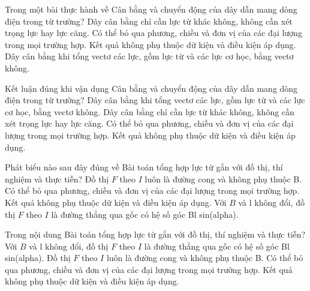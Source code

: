 \begin{ex}
Trong một bài thực hành về Cân bằng và chuyển động của dây dẫn mang dòng điện trong từ trường?
\choice
{Dây cân bằng chỉ cần lực từ khác không, không cần xét trọng lực hay lực căng.}
{Có thể bỏ qua phương, chiều và đơn vị của các đại lượng trong mọi trường hợp.}
{Kết quả không phụ thuộc dữ kiện và điều kiện áp dụng.}
{\True Dây cân bằng khi tổng vectơ các lực, gồm lực từ và các lực cơ học, bằng vectơ không.}
\end{ex}

\begin{ex}
Kết luận đúng khi vận dụng Cân bằng và chuyển động của dây dẫn mang dòng điện trong từ trường?
\choice
{\True Dây cân bằng khi tổng vectơ các lực, gồm lực từ và các lực cơ học, bằng vectơ không.}
{Dây cân bằng chỉ cần lực từ khác không, không cần xét trọng lực hay lực căng.}
{Có thể bỏ qua phương, chiều và đơn vị của các đại lượng trong mọi trường hợp.}
{Kết quả không phụ thuộc dữ kiện và điều kiện áp dụng.}
\end{ex}

\begin{ex}
Phát biểu nào sau đây đúng về Bài toán tổng hợp lực từ gắn với đồ thị, thí nghiệm và thực tiễn?
\choice
{Đồ thị $F$ theo $I$ luôn là đường cong và không phụ thuộc B.}
{Có thể bỏ qua phương, chiều và đơn vị của các đại lượng trong mọi trường hợp.}
{Kết quả không phụ thuộc dữ kiện và điều kiện áp dụng.}
{\True Với $B$ và l không đổi, đồ thị $F$ theo $I$ là đường thẳng qua gốc có hệ số góc Bl sin(alpha).}
\end{ex}

\begin{ex}
Trong nội dung Bài toán tổng hợp lực từ gắn với đồ thị, thí nghiệm và thực tiễn?
\choice
{\True Với $B$ và l không đổi, đồ thị $F$ theo $I$ là đường thẳng qua gốc có hệ số góc Bl sin(alpha).}
{Đồ thị $F$ theo $I$ luôn là đường cong và không phụ thuộc B.}
{Có thể bỏ qua phương, chiều và đơn vị của các đại lượng trong mọi trường hợp.}
{Kết quả không phụ thuộc dữ kiện và điều kiện áp dụng.}
\end{ex}

